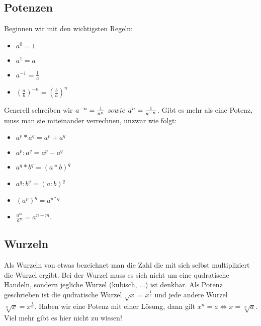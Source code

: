 \documentclass[letterpaper, titlepage]{article}
\begin{document}
\subsection{Potenzen}\label{Potenzen}
Beginnen wir mit den wichtigsten Regeln:
\begin{itemize}
    \item $a^0=1$
    \item $a^1=a$
    \item $a^{-1}=\frac{1}{a}$ 
    \item $(\frac{a}{b})^{-n}=(\frac{b}{a})^n$ 
\end{itemize}
Generell schreiben wir $a^{-n}=\frac{1}{a^n} \hspace{4px} sowie \hspace{4px} a^n=\frac{1}{a^{-n}}$. Gibt es mehr als eine Potenz, muss man sie miteinander verrechnen, unzwar wie folgt:
\begin{itemize}
    \item $a^p * a^q = a^p + a^q$
    \item $a^p : a^q = a^p - a^q$
    \item $a^q * b^q = (a * b)^q$
    \item $a^q : b^q = (a : b)^q$
    \item $(a^p)^q = a^{p*q}$
    \item $\frac{a^m}{a^n}=a^{n-m}$.
\end{itemize}
\subsection{Wurzeln}\label{Wurzeln}
Als Wurzeln von etwas bezeichnet man die Zahl die mit sich selbst multipliziert die Wurzel ergibt. Bei der Wurzel muss es sich nicht um eine qudratische Handeln, sondern jegliche Wurzel (kubisch, ...) ist denkbar. Als Potenz geschrieben ist die qudratische Wurzel $\sqrt{x}=x^{\frac{1}{2}}$ und jede andere Wurzel $\sqrt[n]{x}=x^{\frac{1}{n}}$. Haben wir eine Potenz mit einer Lösung, dann gilt $x^n=a \Leftrightarrow x=\sqrt[n]{a}$. Viel mehr gibt es hier nicht zu wissen!
\end{document}
